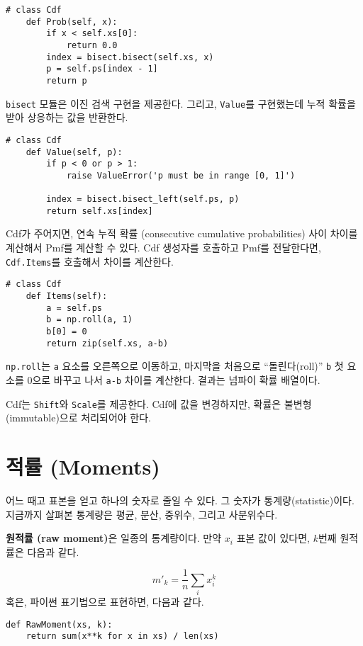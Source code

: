 \begin{verbatim}
# class Cdf
    def Prob(self, x):
        if x < self.xs[0]:
            return 0.0
        index = bisect.bisect(self.xs, x)
        p = self.ps[index - 1]
        return p
\end{verbatim}

{\tt bisect} 모듈은 이진 검색 구현을 제공한다.
그리고, {\tt Value}를 구현했는데 누적 확률을 받아 상응하는 값을 반환한다.

\begin{verbatim}
# class Cdf
    def Value(self, p):
        if p < 0 or p > 1:
            raise ValueError('p must be in range [0, 1]')

        index = bisect.bisect_left(self.ps, p)
        return self.xs[index]
\end{verbatim}

Cdf가 주어지면, 연속 누적 확률 (consecutive cumulative probabilities) 사이 차이를 계산해서 Pmf를 계산할 수 있다.
Cdf 생성자를 호출하고 Pmf를 전달한다면, 
{\tt Cdf.Items}를 호출해서 차이를 계산한다.


\begin{verbatim}
# class Cdf
    def Items(self):
        a = self.ps
        b = np.roll(a, 1)
        b[0] = 0
        return zip(self.xs, a-b)
\end{verbatim}

{\tt np.roll}는 {\tt a} 요소를 오른쪽으로 이동하고,
마지막을 처음으로 ``돌린다(roll)''
{\tt b} 첫 요소를 0으로 바꾸고 나서 {\tt a-b} 차이를 계산한다.
결과는 넘파이 확률 배열이다. 

Cdf는 {\tt Shift}와 {\tt Scale}를 제공한다. 
Cdf에 값을 변경하지만, 확률은 불변형(immutable)으로 처리되어야 한다.

\section{적률 (Moments)}

어느 때고 표본을 얻고 하나의 숫자로 줄일 수 있다. 그 숫자가 통계량(statistic)이다.
지금까지 살펴본 통계량은 평균, 분산, 중위수, 그리고 사분위수다.

{\bf 원적률 (raw moment)}은 일종의 통계량이다. 만약 $x_i$ 표본 값이 있다면,
$k$번째 원적률은 다음과 같다.

%
\[ m'_k = \frac{1}{n} \sum_i x_i^k \]
%
혹은, 파이썬 표기법으로 표현하면, 다음과 같다.

\begin{verbatim}
def RawMoment(xs, k):
    return sum(x**k for x in xs) / len(xs)
\end{verbatim}

